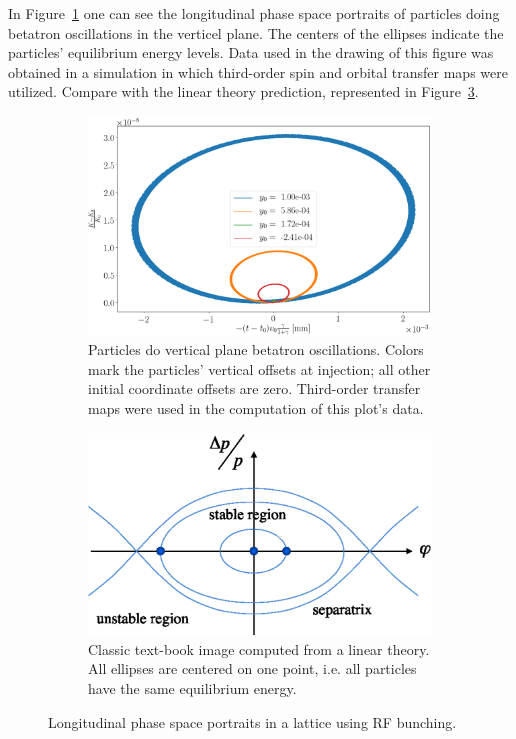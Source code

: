\documentclass[]{elsarticle}
\begin{document}
In Figure~\ref{fig:long_phase_port_3} one can see the longitudinal phase space portraits of particles
doing betatron oscillations in the verticel plane. The centers of the ellipses indicate the particles'
equilibrium energy levels. Data used in the drawing of this figure was obtained in a simulation in which
third-order spin and orbital transfer maps were utilized. Compare with the linear theory prediction, represented
in Figure~\ref{fig:long_phase_port_1}.

\begin{figure}[h]\centering
  \begin{subfigure}{\linewidth}
    \includegraphics[width=\linewidth]{img/decoh/psp_diagram_betatron}
    \caption{Particles do vertical plane betatron oscillations.
      Colors mark the particles' vertical offsets at injection; all other initial coordinate offsets are zero.
      Third-order transfer maps were used in the computation of this plot's data.\label{fig:long_phase_port_3}}
  \end{subfigure}
  \begin{subfigure}{\linewidth}
    \includegraphics[width=\linewidth]{img/decoh/psp_diagram.eps}
    \caption{Classic text-book image computed from a linear theory. All ellipses are centered
    on one point, i.e. all particles have the same equilibrium energy.\label{fig:long_phase_port_1}}
  \end{subfigure}
  \caption{Longitudinal phase space portraits in a lattice using RF bunching.}
\end{figure}
\end{document}
